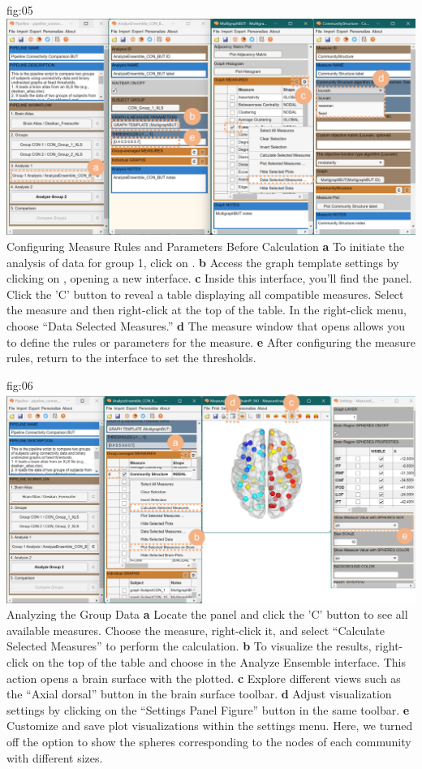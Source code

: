 \documentclass[justified]{tufte-handout}
\begin{document}
	{fig:05}
	{
	\includegraphics{fig05.jpg}
	}
	{Configuring Measure Rules and Parameters Before Calculation}
	{
	{\bf a} To initiate the analysis of data for group 1, click on .
	{\bf b} Access the graph template settings by clicking on , opening a new interface.
	{\bf c} Inside this interface, you'll find the  panel. Click the 'C' button to reveal a table displaying all compatible measures. Select the  measure and then right-click at the top of the table. In the right-click menu, choose “Data Selected Measures.”
	{\bf d} The measure window that opens allows you to define the rules or parameters for the  measure.
	{\bf e} After configuring the measure rules, return to the  interface to set the thresholds.
	}

	{fig:06}
	{
	\includegraphics{fig06.jpg}
	}
	{Analyzing the Group Data}
	{
	{\bf a} Locate the  panel and click the 'C' button to see all available measures. Choose the  measure, right-click it, and select “Calculate Selected Measures” to perform the calculation.
	{\bf b} To visualize the results, right-click on the top of the table and choose  in the Analyze Ensemble interface. This action opens a brain surface with the  plotted.
	{\bf c} Explore different views such as the “Axial dorsal” button in the brain surface toolbar.
	{\bf d} Adjust visualization settings by clicking on the “Settings Panel Figure” button in the same toolbar.
	{\bf e} Customize and save plot visualizations within the settings menu. Here, we turned off the option to show the spheres corresponding to the nodes of each community with different sizes.
	}
 
\end{document}
